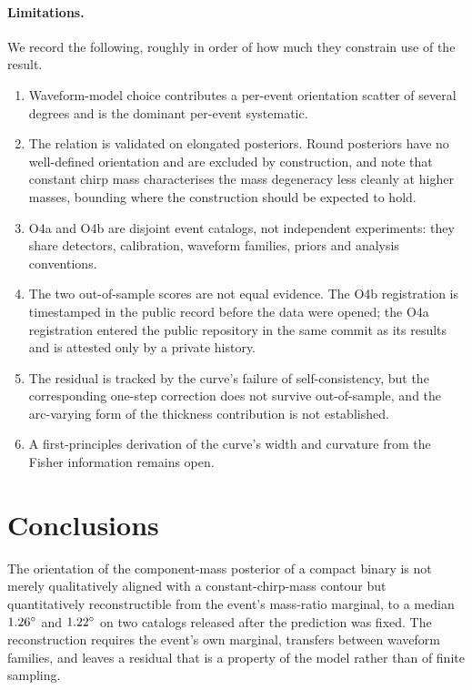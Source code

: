\documentclass[aps,preprint,amsmath,amssymb,nofootinbib,superscriptaddress]{revtex4-2}
\begin{document}
\paragraph{Limitations.} We record the following, roughly in order of how much they constrain use of the
result.
\begin{enumerate}\itemsep2pt \parskip0pt
\item Waveform-model choice contributes a per-event orientation scatter of several degrees and is the
dominant per-event systematic.
\item The relation is validated on elongated posteriors. Round posteriors have no well-defined orientation
and are excluded by construction, and \citet{Baird2013} note that constant chirp mass characterises the
mass degeneracy less cleanly at higher masses, bounding where the construction should be expected to hold.
\item O4a and O4b are disjoint event catalogs, not independent experiments: they share detectors,
calibration, waveform families, priors and analysis conventions.
\item The two out-of-sample scores are not equal evidence. The O4b registration is timestamped in the
public record before the data were opened; the O4a registration entered the public repository in the same
commit as its results and is attested only by a private history.
\item The residual is tracked by the curve's failure of self-consistency, but the corresponding one-step
correction does not survive out-of-sample, and the arc-varying form of the thickness contribution is not
established.
\item A first-principles derivation of the curve's width and curvature from the Fisher information remains
open.
\end{enumerate}

\section{Conclusions}
\label{sec:conclusions}
The orientation of the component-mass posterior of a compact binary is not merely qualitatively aligned
with a constant-chirp-mass contour but quantitatively reconstructible from the event's mass-ratio marginal,
to a median $1.26^\circ$ and $1.22^\circ$ on two catalogs released after the
prediction was fixed. The reconstruction requires the event's own marginal, transfers between waveform
families, and leaves a residual that is a property of the model rather than of finite sampling.
\end{document}
